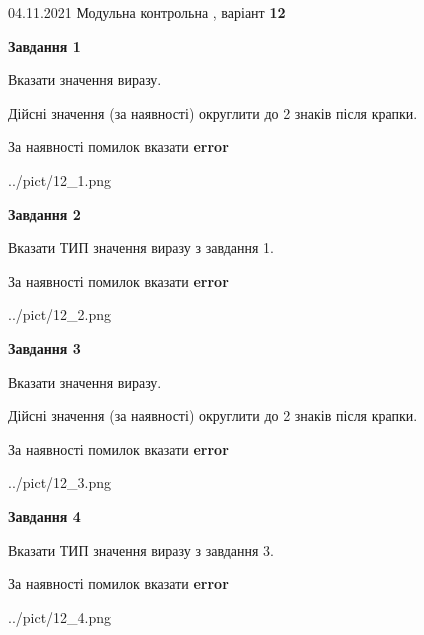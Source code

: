 \documentclass[11pt, ukrainian]{article}
\begin{document}
{04.11.2021 Модульна контрольна , варіант  \No \textbf { 12 }\par}
{
\begin {large}
{\begin {center}\textbf{Завдання 1}\end {center}}\par
Вказати значення виразу. \par
Дійсні значення (за наявності) округлити до 2 знаків після крапки. \par
За наявності помилок вказати \textbf{error}

\begin{center}
	{../pict/12_1.png}
\end{center}
\newpage

{\begin {center}\textbf{Завдання 2}\end {center}}\par
Вказати ТИП значення виразу з завдання 1. \par
За наявності помилок вказати \textbf{error}

\begin{center}
	{../pict/12_2.png}
\end{center}
\newpage

{\begin {center}\textbf{Завдання 3}\end {center}}\par
Вказати значення виразу. \par
Дійсні значення (за наявності) округлити до 2 знаків після крапки. \par
За наявності помилок вказати \textbf{error}

\begin{center}
	{../pict/12_3.png}
\end{center}
\newpage

{\begin {center}\textbf{Завдання 4}\end {center}}\par
Вказати ТИП значення виразу з завдання 3. \par
За наявності помилок вказати \textbf{error}

\begin{center}
	{../pict/12_4.png}
\end{center}
\newpage


\end{large}}
\end{document}

